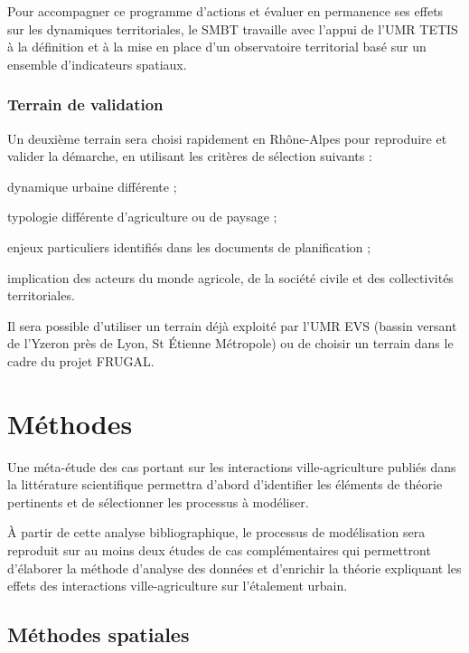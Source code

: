 Pour accompagner ce programme d'actions et évaluer en permanence
ses effets sur les dynamiques territoriales, le SMBT travaille avec l'appui de l'UMR TETIS
à la définition et à la mise en place d'un observatoire territorial basé
sur un ensemble d'indicateurs spatiaux.

\subsubsection{Terrain de validation}

Un deuxième terrain sera choisi rapidement en Rhône-Alpes pour reproduire
et valider la démarche, en utilisant les critères de sélection suivants :

\startitemize

\item dynamique urbaine différente ;
\item typologie différente d’agriculture ou de paysage ;
\item enjeux particuliers identifiés dans les documents de planification ;
\item implication des acteurs du monde agricole, de la société civile
  et des collectivités territoriales.

\stopitemize

Il sera possible d'utiliser un terrain déjà exploité par l'UMR EVS (bassin versant de l'Yzeron près de Lyon,
St Étienne Métropole) ou de choisir un terrain dans le cadre du projet FRUGAL.


\section{Méthodes}

Une méta-étude des cas portant sur les interactions ville-agriculture
publiés dans la littérature scientifique 
permettra d'abord d'identifier les éléments
de théorie pertinents et de sélectionner les processus à modéliser.

À partir de cette analyse bibliographique,
le processus de modélisation sera reproduit sur au moins deux études de cas
complémentaires qui permettront d'élaborer la méthode d'analyse des données
et d'enrichir la théorie expliquant les effets des interactions
ville-agriculture sur l'étalement urbain.

\subsection{Méthodes spatiales}

